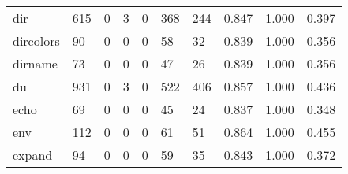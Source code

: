 \begin{longtable}{lp{1.3cm}p{1.3cm}p{1.3cm}p{1.3cm}p{1.3cm}p{1.3cm}p{1.3cm}p{1.3cm}p{1.3cm}}
dir       &                    615 &                                             0 &                                            3 &                                           0 &                                          368 &                                        244 &                                0.847 &                                  1.000 &                                0.397 \\
dircolors &                     90 &                                             0 &                                            0 &                                           0 &                                           58 &                                         32 &                                0.839 &                                  1.000 &                                0.356 \\
dirname   &                     73 &                                             0 &                                            0 &                                           0 &                                           47 &                                         26 &                                0.839 &                                  1.000 &                                0.356 \\
du        &                    931 &                                             0 &                                            3 &                                           0 &                                          522 &                                        406 &                                0.857 &                                  1.000 &                                0.436 \\
echo      &                     69 &                                             0 &                                            0 &                                           0 &                                           45 &                                         24 &                                0.837 &                                  1.000 &                                0.348 \\
env       &                    112 &                                             0 &                                            0 &                                           0 &                                           61 &                                         51 &                                0.864 &                                  1.000 &                                0.455 \\
expand    &                     94 &                                             0 &                                            0 &                                           0 &                                           59 &                                         35 &                                0.843 &                                  1.000 &                                0.372 \\

\end{longtable}
